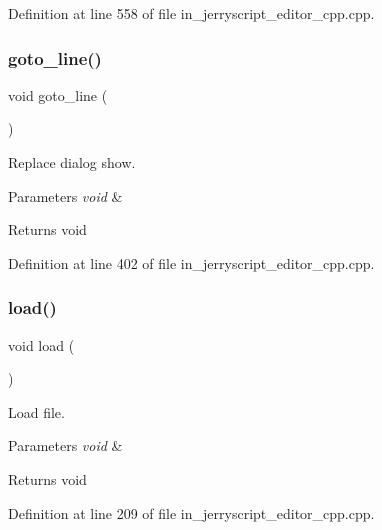 Definition at line 558 of file in\+\_\+jerryscript\+\_\+editor\+\_\+cpp.\+cpp.

\mbox{\label{group___editor_ga8d657d9e2799a4f4978e933a412faf62}} 
\subsubsection{goto\_line()}
{\footnotesize\ttfamily void goto\+\_\+line (\begin{DoxyParamCaption}\item[{void}]{ }\end{DoxyParamCaption})}



Replace dialog show. 


\begin{DoxyParams}{Parameters}
{\em void} & \\
\hline
\end{DoxyParams}
\begin{DoxyReturn}{Returns}
void 
\end{DoxyReturn}


Definition at line 402 of file in\+\_\+jerryscript\+\_\+editor\+\_\+cpp.\+cpp.

\mbox{\label{group___editor_ga11d83bf35f0346e4f579df0257171252}} 
\subsubsection{load()\hspace{0.1cm}{\footnotesize\ttfamily [1/2]}}
{\footnotesize\ttfamily void load (\begin{DoxyParamCaption}\item[{void}]{ }\end{DoxyParamCaption})}



Load file. 


\begin{DoxyParams}{Parameters}
{\em void} & \\
\hline
\end{DoxyParams}
\begin{DoxyReturn}{Returns}
void 
\end{DoxyReturn}


Definition at line 209 of file in\+\_\+jerryscript\+\_\+editor\+\_\+cpp.\+cpp.

\mbox{\label{group___editor_ga8caf41718ffb5bf060de703f18f72546}} 
